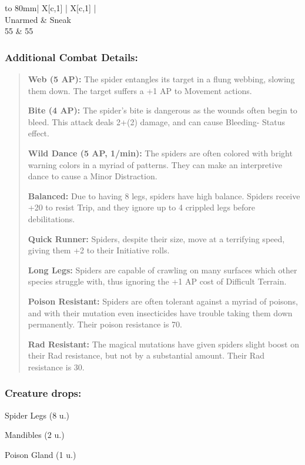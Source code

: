 \documentclass[11pt,a4paper,twocolumn]{book}
\begin{document}
	\bigskip
	{
		\begin{tabu} to 80mm{| X[c,1] | X[c,1] |}
			\hline
			 \\ \hline
			Unarmed & Sneak                                  \\
			55      & 55                                     \\ \hline
		\end{tabu}
		
	}
	
	\subsubsection*{Additional Combat Details:}
	\begin{verse}
		\textbf{Web (5 AP):} The spider entangles its target in a flung webbing, slowing them down. The target suffers a +1 AP to Movement actions.
		
		\textbf{Bite (4 AP):} The spider's bite is dangerous as the wounds often begin to bleed. This attack deals 2+(2) damage, and can cause Bleeding- Status effect.
		
		\textbf{Wild Dance (5 AP, 1/min):} The spiders are often colored with bright warning colors in a myriad of patterns. They can make an interpretive dance to cause a Minor Distraction.
		
		\textbf{Balanced:} Due to having 8 legs, spiders have high balance. Spiders receive +20 to resist Trip, and they ignore up to 4 crippled legs before debilitations.
		
		\textbf{Quick Runner:} Spiders, despite their size, move at a terrifying speed, giving them +2 to their Initiative rolls.
		
		\textbf{Long Legs:} Spiders are capable of crawling on many surfaces which other species struggle with, thus ignoring the +1 AP cost of Difficult Terrain.
		
		\textbf{Poison Resistant:} Spiders are often tolerant against a myriad of poisons, and with their mutation even insecticides have trouble taking them down permanently. Their poison resistance is 70.
		
		\textbf{Rad Resistant:} The magical mutations have given spiders slight boost on their Rad resistance, but not by a substantial amount. Their Rad resistance is 30.
	\end{verse}
	
	\subsubsection*{Creature drops:}
	\begin{compactitem}
		\item Spider Legs (8 u.)
		\item Mandibles (2 u.)
		\item Poison Gland (1 u.)
	\end{compactitem}
	
\end{document}
